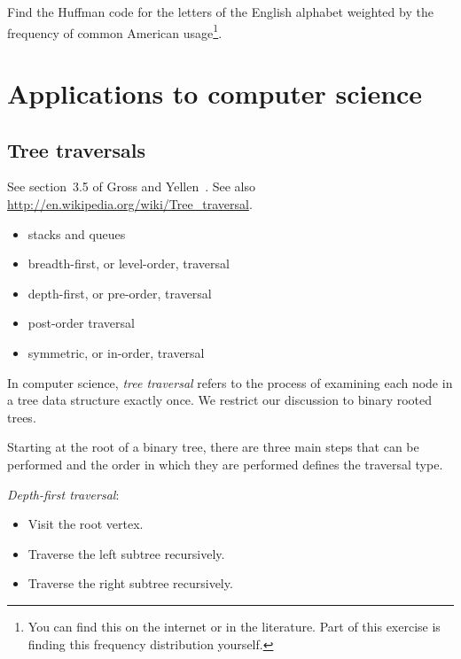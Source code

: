 \begin{exercise}
Find the Huffman code for the letters of the English alphabet weighted
by the frequency of common American usage\footnote{You can find this
on the internet or in the literature.
Part of this exercise is finding this frequency distribution
yourself.}.
\end{exercise}


\section{Applications to computer science}



\subsection{Tree traversals}

See section~3.5 of Gross and Yellen~\cite{GrossYellen1999}.
See also \url{http://en.wikipedia.org/wiki/Tree_traversal}.

\begin{itemize}
\item stacks and queues

\item breadth-first, or level-order, traversal

\item depth-first, or pre-order, traversal

\item post-order traversal

\item symmetric, or in-order, traversal
\end{itemize}

In computer science, {\it tree traversal} refers to the process of
examining each node in a tree data structure exactly once.
We restrict our discussion to binary rooted trees.

Starting at the root of a binary tree, there are three main steps that
can be performed and the order in which they are performed defines the
traversal type.

\noindent
{\it Depth-first traversal}:
\begin{itemize}
\item
Visit the root vertex.

\item
Traverse the left subtree recursively.

\item
Traverse the right subtree recursively.

\end{itemize}


